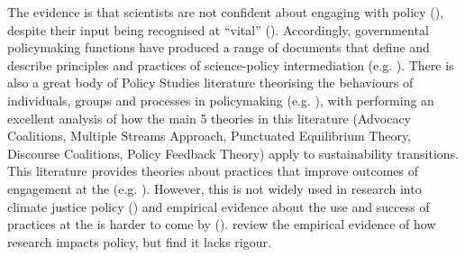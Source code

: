The evidence is that scientists are not confident about engaging with policy (\cite{KEU2021perceptions}), despite their input being recognised at ``vital'' (\cite{KennyRHTB2017}). Accordingly, governmental policymaking functions have produced a range of documents that define and describe principles and practices of science-policy intermediation (e.g. \cite{OECD2015,DottiACDMPSVW2024,KarkkainenLKK2024}). There is also a great body of Policy Studies literature theorising the behaviours of individuals, groups and processes in policymaking (e.g. \cite{Kingdon1993,Hajer2005,Dowding2018}), with \textcite{KernR2018} performing an excellent analysis of how the main 5 theories in this literature (Advocacy Coalitions, Multiple Streams Approach, Punctuated Equilibrium Theory, Discourse Coalitions, Policy Feedback Theory) apply to sustainability transitions. This literature provides theories about practices that improve outcomes of engagement at the \SPI{} (e.g. \cite{RykielEtAl2002,McNie2007,Gluckman2014,BlessenohlS2022}). However, this is not widely used in research into climate justice policy (\cite{CairneyTS2023}) and empirical evidence about the use and success of practices at the \SPI{} is harder to come by (\cite{JagannathanEtAl2023}). \textcite{OliverHBGC2022} review the empirical evidence of how research impacts policy, but find it lacks rigour. 

